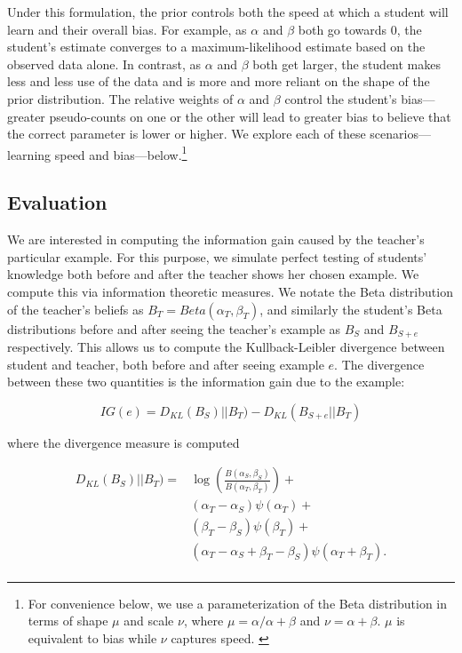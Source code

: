 \documentclass[10pt,letterpaper]{article}
\begin{document}
Under this formulation, the prior controls both the speed at which a student will learn and their overall bias. For example, as $\alpha$ and $\beta$ both go towards 0, the student's estimate converges to a maximum-likelihood estimate based on the observed data alone. In contrast, as $\alpha$ and $\beta$ both get larger, the student makes less and less use of the data and is more and more reliant on the shape of the prior distribution. The relative weights of $\alpha$ and $\beta$ control the student's bias---greater pseudo-counts on one or the other will lead to greater bias to believe that the correct parameter is lower or higher. We explore each of these scenarios---learning speed and bias---below.\footnote{For convenience below, we use a parameterization of the Beta distribution in terms of shape $\mu$ and scale $\nu$, where $\mu=\alpha / \alpha + \beta$ and $\nu = \alpha + \beta$. $\mu$ is equivalent to bias while $\nu$ captures speed. \label{fn:munu}}

\subsection{Evaluation}

We are interested in computing the information gain caused by the teacher's particular example. For this purpose, we simulate perfect testing of students' knowledge both before and after the teacher shows her chosen example. We compute this via information theoretic measures. We notate the Beta distribution of the teacher's beliefs as $B_T = Beta(\alpha_T,\beta_T)$, and similarly the student's Beta distributions before and after seeing the teacher's example as $B_{S}$ and $B_{S+e}$ respectively. This allows us to compute the Kullback-Leibler divergence \cite{cover2012} between student and teacher, both before and after seeing example $e$. The divergence between these two quantities is the information gain due to the example:

\begin{equation}
\label{eq:ig}
IG(e) = D_{KL} ( B_{S})||B_T )  - D_{KL} ( B_{S+e} ||B_T ) 
\end{equation}

\noindent where the divergence measure is computed

\begin{equation}
\label{eq:dkl}
\begin{split}
D_{KL} ( B_{S})||B_T )  = & \log( \frac{B(\alpha_{S},\beta_{S})}{B(\alpha_{T},\beta_{T})}) + \\
& (\alpha_T - \alpha_S) \psi (\alpha_T) + \\ 
& (\beta_T - \beta_S) \psi (\beta_T) + \\
& (\alpha_T - \alpha_S + \beta_T - \beta_S) \psi (\alpha_T + \beta_T). \\
\end{split}
\end{equation}
\end{document}
